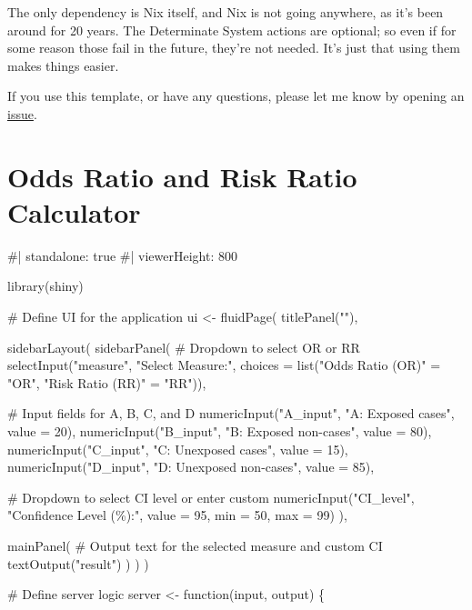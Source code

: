 \documentclass[
  letterpaper,
  paper=6in:9in,
  pagesize=pdftex,
  headinclude=on,
  footinclude=on,
  12pt]{scrbook}
\newenvironment{Shaded}{\begin{snugshade}}{\end{snugshade}}
\newcommand{\NormalTok}[1]{\textcolor[rgb]{0.00,0.23,0.31}{#1}}
\begin{document}
The only dependency is Nix itself, and Nix is not going anywhere, as
it's been around for 20 years. The Determinate System actions are
optional; so even if for some reason those fail in the future, they're
not needed. It's just that using them makes things easier.

If you use this template, or have any questions, please let me know by
opening an
\href{https://github.com/b-rodrigues/quarto_book_nix/issues}{issue}.


\chapter{Odds Ratio and Risk Ratio
Calculator}\label{odds-ratio-and-risk-ratio-calculator}

\begin{Shaded}
\begin{Highlighting}[]
\NormalTok{\#| standalone: true}
\NormalTok{\#| viewerHeight: 800}

\NormalTok{library(shiny)}

\NormalTok{\# Define UI for the application}
\NormalTok{ui \textless{}{-} fluidPage(}
\NormalTok{  titlePanel(""),}
  
\NormalTok{  sidebarLayout(}
\NormalTok{    sidebarPanel(}
\NormalTok{      \# Dropdown to select OR or RR}
\NormalTok{      selectInput("measure", "Select Measure:", }
\NormalTok{                  choices = list("Odds Ratio (OR)" = "OR", "Risk Ratio (RR)" = "RR")),}
      
\NormalTok{      \# Input fields for A, B, C, and D}
\NormalTok{      numericInput("A\_input", "A: Exposed cases", value = 20),}
\NormalTok{      numericInput("B\_input", "B: Exposed non{-}cases", value = 80),}
\NormalTok{      numericInput("C\_input", "C: Unexposed cases", value = 15),}
\NormalTok{      numericInput("D\_input", "D: Unexposed non{-}cases", value = 85),}
      
\NormalTok{      \# Dropdown to select CI level or enter custom}
\NormalTok{      numericInput("CI\_level", "Confidence Level (\%):", value = 95, min = 50, max = 99)}
\NormalTok{    ),}
    
\NormalTok{    mainPanel(}
\NormalTok{      \# Output text for the selected measure and custom CI}
\NormalTok{      textOutput("result")}
\NormalTok{    )}
\NormalTok{  )}
\NormalTok{)}

\NormalTok{\# Define server logic}
\NormalTok{server \textless{}{-} function(input, output) \{}
  

\end{Highlighting}
\end{Shaded}
\end{document}
